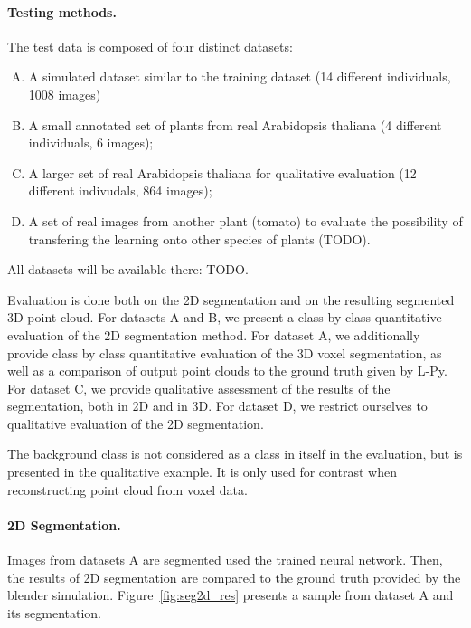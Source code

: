\paragraph{Testing methods.} The test data is composed of four
distinct datasets:
\begin{enumerate}[A.]
    \item A simulated dataset similar to the training dataset (14 different individuals, 1008 images)
    \item A small annotated set of plants from real Arabidopsis thaliana (4 different individuals, 6 images);
    \item A larger set of real Arabidopsis thaliana for qualitative evaluation (12 different indivudals, 864 images);
    \item A set of real images from another plant (tomato) to evaluate the possibility of transfering the learning onto other species of plants (TODO).
\end{enumerate}
All datasets will be available there: TODO.

Evaluation is done both on the 2D segmentation and on the resulting segmented 3D point cloud. For datasets A and B,
we present a class by class quantitative evaluation of the 2D segmentation method. For dataset A, we additionally  provide
class by class quantitative evaluation of the 3D voxel segmentation, as well as a comparison of output point clouds
to the ground truth given by L-Py. For dataset C, we provide qualitative assessment of the results of the segmentation,
both in 2D and in 3D. For dataset D, we restrict ourselves to qualitative evaluation of the 2D segmentation.

The background class is not considered as a class in itself in the evaluation, but is presented in the qualitative example. It
is only used for contrast when reconstructing point cloud from voxel data.

\paragraph{2D Segmentation.}
Images from datasets A are segmented used the trained neural network. Then, the results of 2D segmentation are
compared to the ground truth provided by the blender simulation. Figure~\ref{fig:seg2d_res} presents a sample from
dataset A and its segmentation.

